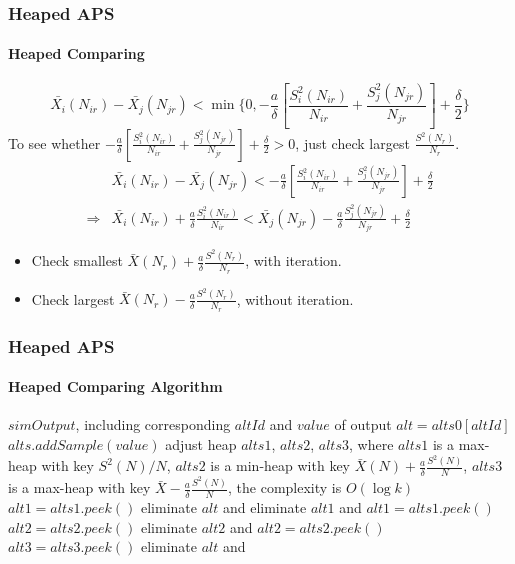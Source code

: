 \documentclass{beamer}
\begin{document}
\begin{frame}
\frametitle{Heaped APS}
\framesubtitle{Heaped Comparing}
$$ \bar{X_{i}}(N_{ir}) - \bar{X_{j}}(N_{jr}) < \min\{0, -\frac{a}{\delta}[\frac{S_i^2(N_{ir})}{N_{ir}} + \frac{S_j^2(N_{jr})}{N_{jr}}] + \frac{\delta}{2}\} $$
To see whether $ -\frac{a}{\delta}[\frac{S_i^2(N_{ir})}{N_{ir}} + \frac{S_j^2(N_{jr})}{N_{jr}}] + \frac{\delta}{2} > 0$, just check largest $\frac{S^2(N_r)}{N_r}$.
\begin{align*}
& \bar{X_{i}}(N_{ir}) - \bar{X_{j}}(N_{jr}) < -\frac{a}{\delta}[\frac{S_i^2(N_{ir})}{N_{ir}} + \frac{S_j^2(N_{jr})}{N_{jr}}] + \frac{\delta}{2} \\
\Longrightarrow & \bar{X_{i}}(N_{ir}) + \frac{a}{\delta}\frac{S_i^2(N_{ir})}{N_{ir}} < \bar{X_{j}}(N_{jr}) - \frac{a}{\delta}\frac{S_j^2(N_{jr})}{N_{jr}} + \frac{\delta}{2}
\end{align*}
\begin{itemize}
\item Check smallest $\bar{X}(N_r) + \frac{a}{\delta}\frac{S^2(N_r)}{N_r}$, with iteration.
\item Check largest $\bar{X}(N_r) - \frac{a}{\delta}\frac{S^2(N_r)}{N_r}$, without iteration.
\end{itemize}
\end{frame}

\begin{frame}
\frametitle{Heaped APS}
\framesubtitle{Heaped Comparing Algorithm}
\begin{algorithmic}[1]
\tiny
{
\Require $simOutput$, including corresponding $altId$ and $value$ of output
\State $alt = alts0[altId]$ 
  \State \Return
\EndIf
\State $alts.addSample(value)$ 
\State adjust heap $alts1$, $alts2$, $alts3$, where $alts1$ is a max-heap with key $S^2(N)/N$, $alts2$ is a min-heap with key $\bar{X}(N) + \frac{a}{\delta}\frac{S^2(N)}{N}$, $alts3$ is a max-heap with key $\bar{X} - \frac{a}{\delta}\frac{S^2(N)}{N}$, the complexity is $O(\log k)$
\State $alt1 = alts1.peek()$
    \State eliminate $alt$ and \Return {}
  \Else
    \State eliminate $alt1$ and $alt1 = alts1.peek()$ 
  \EndIf
\EndWhile
\State $alt2 = alts2.peek()$
  \State eliminate $alt2$ and $alt2 = alts2.peek()$ 
\EndWhile
\State $alt3 = alts3.peek()$
  \State eliminate $alt$ and \Return {}
\EndIf
}
\end{algorithmic}
\end{frame}
\end{document}

